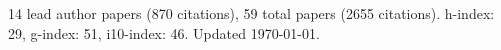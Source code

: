 14 lead author papers (870 citations),
59 total papers (2655 citations).\newline
h-index: 29, g-index: 51, i10-index: 46. Updated \today.